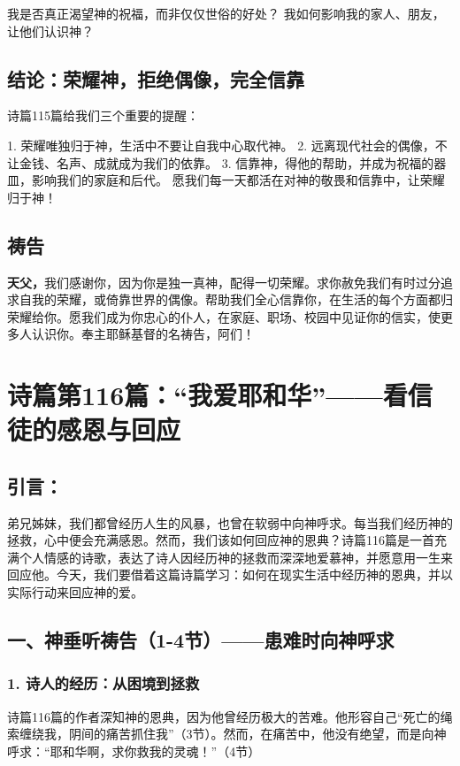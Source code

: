 \documentclass[a4paper, 12pt]{article}
\begin{document}
我是否真正渴望神的祝福，而非仅仅世俗的好处？
我如何影响我的家人、朋友，让他们认识神？
\subsection*{结论：荣耀神，拒绝偶像，完全信靠}
诗篇115篇给我们三个重要的提醒：

1. 荣耀唯独归于神，生活中不要让自我中心取代神。
2. 远离现代社会的偶像，不让金钱、名声、成就成为我们的依靠。
3. 信靠神，得他的帮助，并成为祝福的器皿，影响我们的家庭和后代。
愿我们每一天都活在对神的敬畏和信靠中，让荣耀归于神！

\subsection*{祷告}
\textbf{天父，}我们感谢你，因为你是独一真神，配得一切荣耀。求你赦免我们有时过分追求自我的荣耀，或倚靠世界的偶像。帮助我们全心信靠你，在生活的每个方面都归荣耀给你。愿我们成为你忠心的仆人，在家庭、职场、校园中见证你的信实，使更多人认识你。奉主耶稣基督的名祷告，阿们！
\newpage
\section{诗篇第116篇：“我爱耶和华”——看信徒的感恩与回应}


\subsection*{引言：}
弟兄姊妹，我们都曾经历人生的风暴，也曾在软弱中向神呼求。每当我们经历神的拯救，心中便会充满感恩。然而，我们该如何回应神的恩典？诗篇116篇是一首充满个人情感的诗歌，表达了诗人因经历神的拯救而深深地爱慕神，并愿意用一生来回应他。今天，我们要借着这篇诗篇学习：如何在现实生活中经历神的恩典，并以实际行动来回应神的爱。

\subsection*{一、神垂听祷告（1-4节）——患难时向神呼求}

\subsubsection*{1. 诗人的经历：从困境到拯救}
诗篇116篇的作者深知神的恩典，因为他曾经历极大的苦难。他形容自己“死亡的绳索缠绕我，阴间的痛苦抓住我”（3节）。然而，在痛苦中，他没有绝望，而是向神呼求：“耶和华啊，求你救我的灵魂！”（4节）
\end{document}
